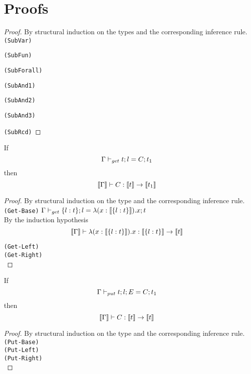 \section{Proofs}

\begin{proof}
By structural induction on the types and the corresponding inference rule. \\

\texttt{(SubVar)}

\texttt{(SubFun)}

\texttt{(SubForall)}

\texttt{(SubAnd1)}

\texttt{(SubAnd2)}

\texttt{(SubAnd3)}

\texttt{(SubRcd)}

\end{proof}

\begin{lemma}
  If $$ \Gamma \vdash_{get} t ; l = C ; t_1 $$
  then $$ \llbracket \Gamma \rrbracket \vdash C : \llbracket t \rrbracket \to \llbracket t_1 \rrbracket $$
\end{lemma}

\begin{proof}
By structural induction on the type and the corresponding inference rule. \\

\texttt{(Get-Base)} $ \Gamma \vdash_{get} \{ l : t \} ; l = \lambda (x : \llbracket \{ l : t \} \rrbracket). x ; t $ \\

By the induction hypothesis
$$ \llbracket \Gamma \rrbracket \vdash \lambda (x : \llbracket \{ l : t \} \rrbracket). x : \llbracket \{ l : t \} \rrbracket \to \llbracket t \rrbracket $$

\texttt{(Get-Left)} \\
\texttt{(Get-Right)} \\

\end{proof}

\begin{lemma}
  If $$ \Gamma \vdash_{put} t ; l ; E = C ; t_1 $$
  then $$ \llbracket \Gamma \rrbracket \vdash C : \llbracket t \rrbracket \to \llbracket t \rrbracket $$
\end{lemma}

\begin{proof}
By structural induction on the type and the corresponding inference rule. \\

\texttt{(Put-Base)} \\
\texttt{(Put-Left)} \\
\texttt{(Put-Right)} \\
\end{proof}

